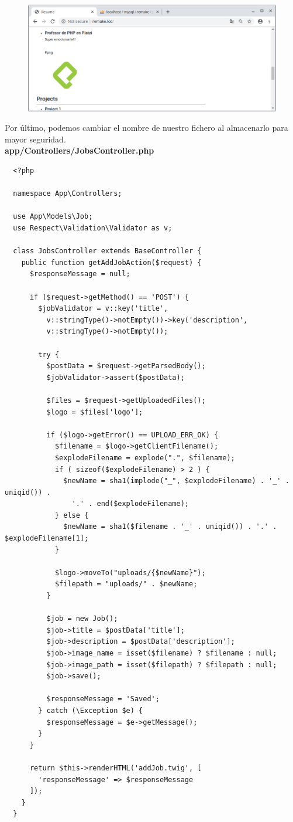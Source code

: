 \documentclass{article}
\begin{document}
\begin{figure}[h!]
  \centering
  \includegraphics[scale=0.5]{./Pictures/188_image_views_ok.png}
\end{figure}

Por último, podemos cambiar el nombre de nuestro fichero al almacenarlo para
mayor seguridad.\\

\textbf{app/Controllers/JobsController.php}
\begin{verbatim}
  <?php

  namespace App\Controllers;

  use App\Models\Job;
  use Respect\Validation\Validator as v;

  class JobsController extends BaseController {
    public function getAddJobAction($request) {
      $responseMessage = null;

      if ($request->getMethod() == 'POST') {
        $jobValidator = v::key('title',
          v::stringType()->notEmpty())->key('description',
          v::stringType()->notEmpty());

        try {
          $postData = $request->getParsedBody();
          $jobValidator->assert($postData);

          $files = $request->getUploadedFiles();
          $logo = $files['logo'];

          if ($logo->getError() == UPLOAD_ERR_OK) {
            $filename = $logo->getClientFilename();
            $explodeFilename = explode(".", $filename);
            if ( sizeof($explodeFilename) > 2 ) {
              $newName = sha1(implode("_", $explodeFilename) . '_' . uniqid()) .
                '.' . end($explodeFilename);
            } else {
              $newName = sha1($filename . '_' . uniqid()) . '.' . $explodeFilename[1];
            }

            $logo->moveTo("uploads/{$newName}");
            $filepath = "uploads/" . $newName;
          }

          $job = new Job();
          $job->title = $postData['title'];
          $job->description = $postData['description'];
          $job->image_name = isset($filename) ? $filename : null;
          $job->image_path = isset($filepath) ? $filepath : null;
          $job->save();

          $responseMessage = 'Saved';
        } catch (\Exception $e) {
          $responseMessage = $e->getMessage();
        }
      }

      return $this->renderHTML('addJob.twig', [
        'responseMessage' => $responseMessage
      ]);
    }
  }
\end{verbatim}
\end{document}
